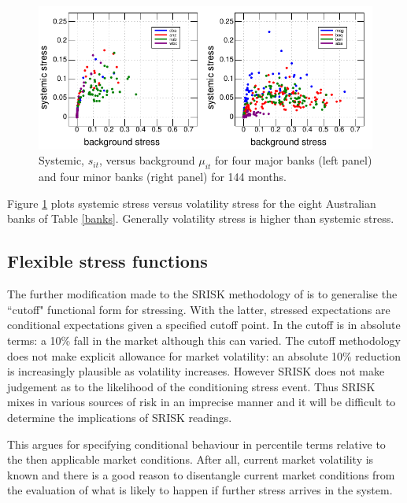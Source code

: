\documentclass[authoryear]{elsarticle}
\newcommand{\fref}[1]{Figure \ref{#1}}
\newcommand{\tref}[1]{Table \ref{#1}}
\begin{document}
\begin{figure}[htbp]
\begin{center}
\includegraphics{figures/sysstress.pdf}
\caption{Systemic, $s_{it}$, versus background $\mu_{it}$   for four major banks (left panel) and four minor banks (right panel)  for 144 months.}
\label{sysstress}
\end{center}
\end{figure}

\fref{sysstress} plots systemic stress versus volatility stress for the eight Australian banks of \tref{banks}.   Generally volatility stress is higher than systemic stress.

\subsection{Flexible  stress  functions}

The further modification made to the SRISK methodology of \cite{brownlees2015} is to generalise the ``cutoff" functional form for stressing.   With the latter, stressed expectations are conditional expectations given a specified cutoff point.    In \cite{brownlees2015} the cutoff is in absolute terms:  a 10\% fall in the market although this can varied.   The cutoff methodology does not make explicit allowance for market volatility:   an absolute 10\% reduction is  increasingly plausible  as volatility increases.   However  SRISK does not  make judgement as to the likelihood of the conditioning stress event.   Thus SRISK mixes in various  sources of risk in an imprecise manner and it will be difficult to determine the implications of SRISK readings.

 This argues for specifying conditional behaviour in percentile terms relative to the then applicable market conditions.  After all, current market volatility is known and there is a good reason to disentangle current market conditions from the evaluation of what is likely to happen if further stress arrives in the system.
\end{document}
